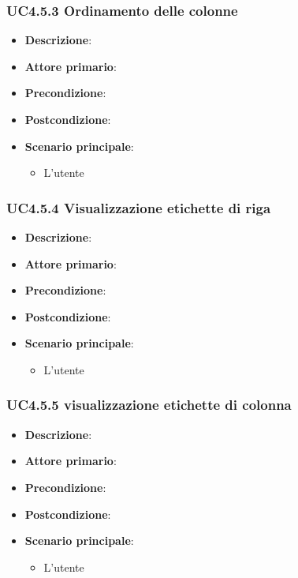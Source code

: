 \subsubsection{UC4.5.3 Ordinamento delle colonne}
\label{ssub:uc4.5.3}
\begin{itemize}
    \item \textbf{Descrizione}:
    \item \textbf{Attore primario}:
    \item \textbf{Precondizione}:
    \item \textbf{Postcondizione}:
    \item \textbf{Scenario principale}:
    \begin{itemize}
        \item L'utente
    \end{itemize}
\end{itemize}

\subsubsection{UC4.5.4 Visualizzazione etichette di riga}
\label{ssub:uc4.5.4}
\begin{itemize}
    \item \textbf{Descrizione}:
    \item \textbf{Attore primario}:
    \item \textbf{Precondizione}:
    \item \textbf{Postcondizione}:
    \item \textbf{Scenario principale}:
    \begin{itemize}
        \item L'utente
    \end{itemize}
\end{itemize}

\subsubsection{UC4.5.5 visualizzazione etichette di colonna}
\label{ssub:uc4.5.5}
\begin{itemize}
    \item \textbf{Descrizione}:
    \item \textbf{Attore primario}:
    \item \textbf{Precondizione}:
    \item \textbf{Postcondizione}:
    \item \textbf{Scenario principale}:
    \begin{itemize}
        \item L'utente
    \end{itemize}
\end{itemize}

